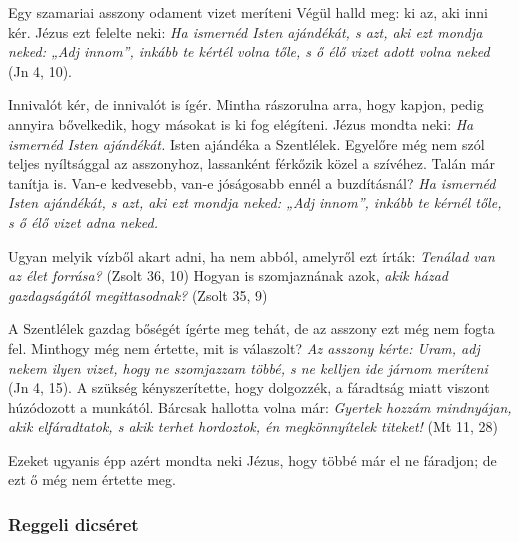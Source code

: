 \documentclass[twoside]{article}
\begin{document}
\begin{lectio}{Egy szamariai asszony odament vizet meríteni}
Végül halld meg: ki az, aki inni kér. Jézus ezt felelte neki: \textit{Ha ismernéd Isten ajándékát, %
s azt, aki ezt mondja neked: „Adj innom”, inkább te kértél volna tőle, s ő élő vizet adott volna %
neked} (Jn 4, 10).

Innivalót kér, de innivalót is ígér. Mintha rászorulna arra, hogy kapjon, pedig annyira %
bővelkedik, hogy másokat is ki fog elégíteni. Jézus mondta neki: \textit{Ha ismernéd Isten %
ajándékát.} Isten ajándéka a Szentlélek. Egyelőre még nem szól teljes nyíltsággal az asszonyhoz, %
lassanként férkőzik közel a szívéhez. Talán már tanítja is. Van-e kedvesebb, van-e jóságosabb %
ennél a buzdításnál? \textit{Ha ismernéd Isten ajándékát, s azt, aki ezt mondja neked: „Adj %
innom”, inkább te kérnél tőle, s ő élő vizet adna neked.}

Ugyan melyik vízből akart adni, ha nem abból, amelyről ezt írták: \textit{Tenálad van az élet %
forrása?} (Zsolt 36, 10) Hogyan is szomjaznának azok, \textit{akik házad gazdagságától %
megittasodnak?} (Zsolt 35, 9)

A Szentlélek gazdag bőségét ígérte meg tehát, de az asszony ezt még nem fogta fel. Minthogy még %
nem értette, mit is válaszolt? \textit{Az asszony kérte: Uram, adj nekem ilyen vizet, hogy ne %
szomjazzam többé, s ne kelljen ide járnom meríteni} (Jn 4, 15). A szükség kényszerítette, hogy %
dolgozzék, a fáradtság miatt viszont húzódozott a munkától. Bárcsak hallotta volna már: \textit{%
Gyertek hozzám mindnyájan, akik elfáradtatok, s akik terhet hordoztok, én megkönnyítelek titeket!} %
(Mt 11, 28)

Ezeket ugyanis épp azért mondta neki Jézus, hogy többé már el ne fáradjon; de ezt ő még nem %
értette meg.
\end{lectio}



\subsubsection*{Reggeli dicséret}
\end{document}
